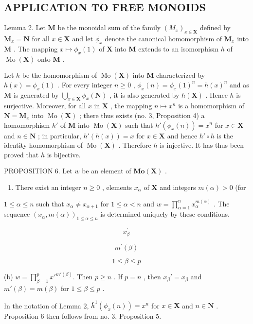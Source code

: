 \subsection{APPLICATION TO FREE MONOIDS}

Lemma 2. Let \(\mathbf{M}\) be the monoidal sum of the family \((M_x)_{x\in \mathbf{X}}\) defined by \(\mathbf{M}_x = \mathbf{N}\) for all \(x\in \mathbf{X}\) and let \(\phi_{x}\) denote the canonical homomorphism of \(\mathbf{M}_x\) into \(\mathbf{M}\) . The mapping \(x\mapsto \phi_x(1)\) of \(\mathbf{X}\) into \(\mathbf{M}\) extends to an isomorphism \(h\) of \(\operatorname {Mo}(\mathbf{X})\) onto \(\mathbf{M}\) .

Let \(h\) be the homomorphism of \(\operatorname{Mo}(\mathbf{X})\) into \(\mathbf{M}\) characterized by \(h(x) = \phi_x(1)\) . For every integer \(n \geqslant 0\) , \(\phi_x(n) = \phi_x(1)^n = h(x)^n\) and as \(\mathbf{M}\) is generated by \(\bigcup_{x \in \mathbf{X}} \phi_x(\mathbf{N})\) , it is also generated by \(h(\mathbf{X})\) . Hence \(h\) is surjective. Moreover, for all \(x\) in \(\mathbf{X}\) , the mapping \(n \mapsto x^n\) is a homomorphism of \(\mathbf{N} = \mathbf{M}_x\) into \(\operatorname{Mo}(\mathbf{X})\) ; there thus exists (no. 3, Proposition 4) a homomorphism \(h'\) of \(\mathbf{M}\) into \(\operatorname{Mo}(\mathbf{X})\) such that \(h'(\phi_x(n)) = x^n\) for \(x \in \mathbf{X}\) and \(n \in \mathbf{N}\) ; in particular, \(h'(h(x)) = x\) for \(x \in \mathbf{X}\) and hence \(h' \circ h\) is the identity homomorphism of \(\operatorname{Mo}(\mathbf{X})\) . Therefore \(h\) is injective. It has thus been proved that \(h\) is bijective.

PROPOSITION 6. Let \(w\) be an element of \(\mathbf{Mo}(\mathbf{X})\) .

\begin{enumerate}
\def\labelenumi{(\alph{enumi})}
\tightlist
\item
  There exist an integer \(n \geqslant 0\) , elements \(x_{\alpha}\) of \(\mathbf{X}\) and integers \(m(\alpha) > 0\) (for
\end{enumerate}

\(1 \leqslant \alpha \leqslant n\) such that \(x_{\alpha} \neq x_{\alpha + 1}\) for \(1 \leqslant \alpha < n\) and \(w = \prod_{\alpha = 1}^{n} x_{\alpha}^{m(\alpha)}\) . The sequence \((x_{\alpha}, m(\alpha))_{1 \leqslant \alpha \leqslant n}\) is determined uniquely by these conditions.

\[
x _ {\beta} ^ {\prime}
\]

\[
m ^ {\prime} (\beta)
\]

\[
1 \leqslant \beta \leqslant p
\]

(b) \(w = \prod_{\beta=1}^{p} x'^{m'(\beta)}.\) Then \(p \geqslant n\) . If \(p = n\) , then \(x_{\beta}' = x_{\beta}\) and \(m'(\beta) = m(\beta)\) for \(1 \leqslant \beta \leqslant p\) .

In the notation of Lemma 2, \(\bar{h}^{1}(\phi_x(n)) = x^n\) for \(x \in \mathbf{X}\) and \(n \in \mathbf{N}\) . Proposition 6 then follows from no. 3, Proposition 5.

